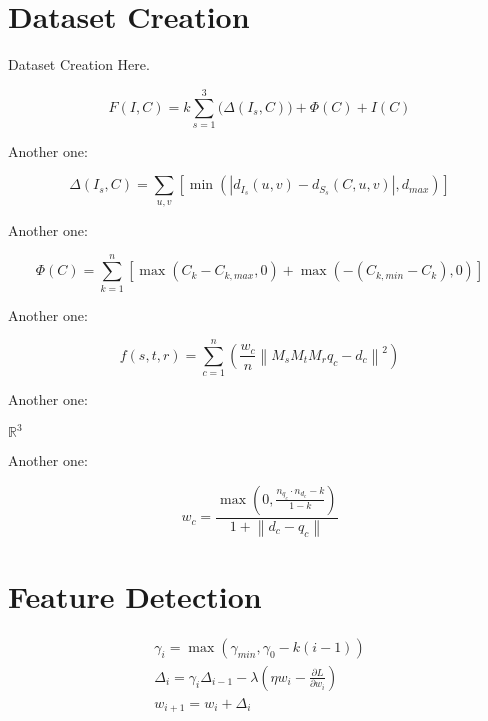\documentclass{acmtog}
\begin{document}
\section{Dataset Creation}
\label{sec:datasetcreation}

Dataset Creation Here.

\begin{equation}
F\left(I, C\right)=k\sum_{s=1}^3\bigg(\Delta(I_s, C)\bigg) + \Phi\left(C\right) + I\left(C\right)
\end{equation}

Another one:

\begin{equation}
\Delta\left(I_s,C\right)=\sum_{u,v}\left[\operatorname{min}\left(\left|d_{I_s}(u,v)-d_{S_s}(C,u,v)\right|,d_{max}\right)\right]
\end{equation}

Another one:

\begin{equation}
\Phi\left(C\right) = \sum_{k=1}^n\left[\operatorname{max}\left(C_k-C_{k,max}, 0\right) + \operatorname{max}\left(-\left(C_{k,min}-C_k\right), 0\right)\right]
\end{equation}

Another one:

\begin{equation}
f(s, t, r) = \sum_{c=1}^n\left(\frac{w_c}{n} \left\|M_s M_t M_r q_c - d_c\right\|^2 \right)
\end{equation}

Another one: 

$\mathbb{R}^3$

Another one:

\begin{equation}
w_c = \frac{\operatorname{max}\left(0, \frac{n_{q_c}\cdot n_{d_c} - k}{ 1 - k}\right)}{1 + \left\|d_c-q_c\right\|}
\end{equation}

\section{Feature Detection}
\label{sec:realtimefeaturedetection}

\begin{eqnarray}
\gamma_i = \operatorname{max}\left(\gamma_{min},\gamma_0-k\left(i-1\right)\right) \\
\Delta_i = \gamma_i\Delta_{i-1}-\lambda\left(\eta w_i-\frac{\partial L}{\partial w_i}\right) \\
w_{i+1} = w_i + \Delta_i
\end{eqnarray}
\end{document}

